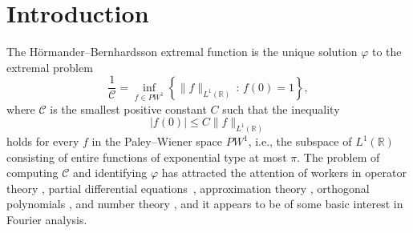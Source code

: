 \documentclass[12pt]{amsart}
\theoremstyle{plain}
\numberwithin{equation}{section}
\theoremstyle{definition}
\newcommand{\Cone}{\mathscr{C}}
\begin{document}
\begin{abstract}
We characterize the function $\varphi$ of minimal $L^1$ norm among all functions $f$ of exponential type at most $\pi$ for which $f(0)=1$. This function, studied by
H\"{o}rmander and Bernhardsson in 1993, has only real zeros $\pm \tau_n$, $n=1,2, \ldots$. Starting from the fact that $n+\frac12-\tau_n$ is an $\ell^2$ sequence, established in an earlier paper of ours, we identify $\varphi$ in the following way. We factor $\varphi(z)$ as $\Phi(z)\Phi(-z)$, where $\Phi(z)= \prod_{n=1}^\infty(1+(-1)^n\frac{z}{\tau_n})$ and show that $\Phi$ satisfies a certain  second order linear differential equation along with a functional equation either of which characterizes $\Phi$. We use these facts to establish an odd power series expansion of $n+\frac12-\tau_n$ in terms of $(n+\frac12)^{-1}$ and a power series expansion of the Fourier transform of $\varphi$, as suggested by the numerical work of H\"{o}rmander and Bernhardsson. The dual characterization of $\Phi$ arises from a commutation relation that holds more generally for a two-parameter family of differential operators, a fact that is used to perform high precision numerical computations. 
\end{abstract}
\maketitle
\tableofcontents

\section{Introduction}
The H\"{o}rmander--Bernhardsson extremal function is the unique solution $\varphi$ to the extremal problem
\begin{equation}\label{eq:extremalproblem}
	\frac{1}{\Cone} = \inf_{f \in PW^1} \left\{\|f\|_{L^1(\mathbb R)} \,: \, f(0) = 1\right\},
\end{equation}
where
$\Cone$  is the smallest positive constant $C$ such that the inequality 
\begin{equation}\label{eq:pointeval}
	|f(0)| \leq C \|f\|_{L^1(\mathbb R)}
\end{equation}
holds for every $f$ in the Paley--Wiener space $PW^1$, i.e., the subspace of $L^1(\mathbb{R})$ consisting of entire functions of exponential type at most $\pi$. The problem of computing
$\Cone$ and identifying $\varphi$ has attracted the attention of workers in operator theory \cite{BDK89}, partial differential equations~\cite{HB93}, approximation theory \cite{AKP96, Gorbachev05}, orthogonal polynomials \cite{LL15, Lubinsky17}, and number theory \cite{CMS19}, and it appears to be of some basic interest in Fourier analysis.
\end{document}
